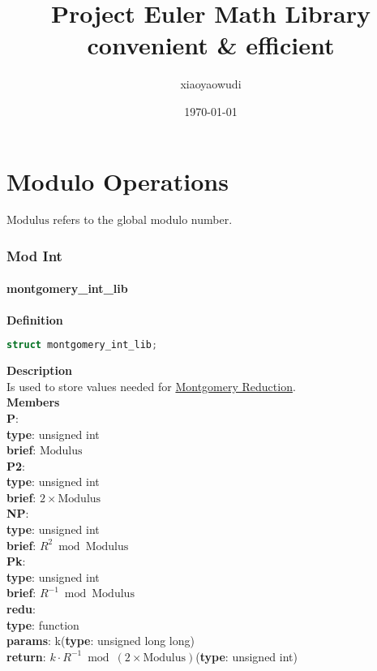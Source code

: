 \documentclass[8pt, a4paper, oneside, twocolumn]{article}
\title{{\Huge{\textbf{Project Euler Math Library}}}\\convenient \& efficient}
\author{xiaoyaowudi}
\date{\today}
\begin{document}
\maketitle
{}
\setcounter{page}{1}
\tableofcontents
\part{Modulo Operations}
$\mathrm{Modulus}$ refers to the global modulo number.
\section{Mod Int}
\subsection{montgomery\_int\_lib}
\noindent \large \textbf{Definition} \normalsize
\begin{lstlisting}[language=c++]
struct montgomery_int_lib;
\end{lstlisting}
\noindent \large \textbf{Description} \normalsize \\
Is used to store values needed for \href{https://en.wikipedia.org/wiki/Montgomery_modular_multiplication}{Montgomery Reduction}.\\
\noindent \large \textbf{Members} \normalsize \\
\textbf{P}:\\
\indent\textbf{type}: unsigned int\\
\indent\textbf{brief}: $\mathrm{Modulus}$\\
\textbf{P2}:\\
\indent\textbf{type}: unsigned int\\
\indent\textbf{brief}: $2\times \mathrm{Modulus}$\\
\textbf{NP}:\\
\indent\textbf{type}: unsigned int\\
\indent\textbf{brief}: $R^2\bmod\mathrm{Modulus}$\\
\textbf{Pk}:\\
\indent\textbf{type}: unsigned int\\
\indent\textbf{brief}: $R^{-1}\bmod\mathrm{Modulus}$\\
\textbf{redu}:\\
\indent\textbf{type}: function\\
\indent\textbf{params}: k(\textbf{type}: unsigned long long)\\
\indent\textbf{return}: $k\cdot R^{-1}\bmod \left(2\times\mathrm{Modulus}\right)$(\textbf{type}: unsigned int)\\
\end{document}
